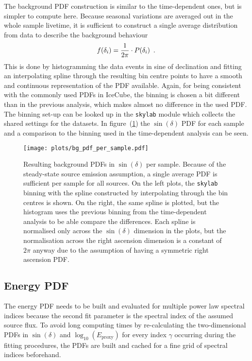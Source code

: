 The background PDF construction is similar to the time-dependent ones, but is simpler to compute here.
Because seasonal variations are averaged out in the whole sample livetime, it is sufficient to construct a single average distribution from data to describe the background behaviour
\begin{equation}
  f(\delta_i) = \frac{1}{2\pi}\cdot P(\delta_i)
  \enspace\text{.}
\end{equation}
This is done by histogramming the data events in sine of declination and fitting an interpolating spline through the resulting bin centre points to have a smooth and continuous representation of the PDF available.
Again, for being consistent with the commonly used PDFs in IceCube, the binning is chosen a bit different than in the previous analysis, which makes almost no difference in the used PDF.
The binning set-up can be looked up in the \lstinline!skylab! module which collects the shared settings for the datasets.
In figure~(\ref{fig:tindep_bg_pdf_per_sample}) the $\sin(\delta)$ PDF for each sample and a comparison to the binning used in the time-dependent analysis can be seen.

\begin{figure}[htbp]
  \centering
  \texttt{[image: plots/bg\_pdf\_per\_sample.pdf]}
  \caption[Background PDFs per source per sample for the time-integrated analysis]{
    Resulting background PDFs in $\sin(\delta)$ per sample.
    Because of the steady-state source emission assumption, a single average PDF is sufficient per sample for all sources.
    On the left plots, the \lstinline!skylab! binning with the spline constructed by interpolating through the bin centres is shown.
    On the right, the same spline is plotted, but the histogram uses the previous binning from the time-dependent analysis to be able compare the differences.
    Each spline is normalised only across the $\sin(\delta)$ dimension in the plots, but the normalisation across the right ascension dimension is a constant of $2\pi$ anyway due to the assumption of having a symmetric right ascension PDF.
  }
  \label{fig:tindep_bg_pdf_per_sample}
\end{figure}

\subsection*{Energy PDF}
The energy PDF needs to be built and evaluated for multiple power law spectral indices because the second fit parameter is the spectral index of the assumed source flux.
To avoid long computing times by re-calculating the two-dimensional PDFs in $\sin(\delta)$ and $\log_{10}\left(E_\text{proxy}\right)$ for every index $\gamma$ occurring during the fitting procedures, the PDFs are built and cached for a fine grid of spectral indices beforehand.

